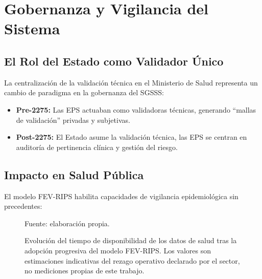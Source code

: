 \documentclass[12pt,letterpaper]{report}
\newcommand{\fuentepropia}{%
  \vspace{-0.4em}%
  {\footnotesize Fuente: elaboración propia.}%
}
\begin{document}
\section{Gobernanza y Vigilancia del Sistema}

\subsection{El Rol del Estado como Validador Único}

La centralización de la validación técnica en el Ministerio de Salud representa un cambio de paradigma en la gobernanza del SGSSS:

\begin{itemize}
    \item \textbf{Pre-2275:} Las EPS actuaban como validadoras técnicas, generando ``mallas de validación'' privadas y subjetivas.
    \item \textbf{Post-2275:} El Estado asume la validación técnica, las EPS se centran en auditoría de pertinencia clínica y gestión del riesgo.
\end{itemize}

\subsection{Impacto en Salud Pública}

El modelo FEV-RIPS habilita capacidades de vigilancia epidemiológica sin precedentes:

\begin{figure}[H]
\centering
{}
\caption{Evolución del tiempo de disponibilidad de los datos de salud tras la
adopción progresiva del modelo FEV-RIPS. Los valores son estimaciones
indicativas del rezago operativo declarado por el sector, no mediciones
propias de este trabajo.}
\label{fig:tiempo}
\fuentepropia
\end{figure}
\end{document}
